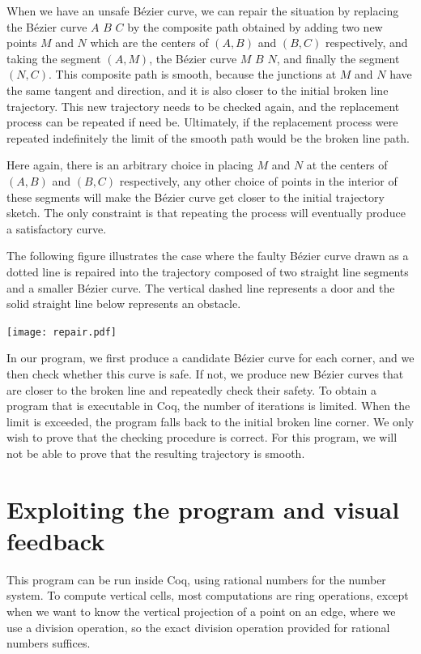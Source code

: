 \documentclass{llncs}
\begin{document}
When we have an unsafe Bézier curve, we can repair the situation by
replacing the Bézier curve \(A\) \(B\) \(C\) by the composite path
obtained by adding two new points \(M\) and \(N\) which are the
centers of \((A,B)\) and \((B,C)\) respectively, and taking the
segment \((A,M)\), the Bézier curve \(M\) \(B\) \(N\), and finally the
segment \((N, C)\).  This composite path is smooth, because the
junctions at \(M\) and \(N\) have the same tangent and direction, and
it is also closer to the initial broken line trajectory.  
This new trajectory needs to be checked again,
and the replacement process can be repeated if need be.  Ultimately,
if the replacement process were repeated indefinitely the limit of the
smooth path would be the broken line path.

Here again, there is an arbitrary choice in placing \(M\) and \(N\) at
the centers of \((A,B)\) and \((B,C)\) respectively, any other choice
of points in the interior of these segments will make the Bézier curve
get closer to the initial trajectory sketch.  The only constraint is
that repeating the process will eventually produce a satisfactory curve.

The following figure illustrates the case where the faulty Bézier
curve drawn as a dotted line is repaired into the trajectory composed of two
straight line segments and a smaller Bézier curve.  The vertical
dashed line represents a door and the solid straight line below
represents an obstacle.

\begin{center}
\texttt{[image: repair.pdf]}
\end{center}

In our program, we first produce a candidate Bézier curve for each
corner, and we then check whether this curve is safe.  If not, we
produce new Bézier curves that are closer to the broken line and
repeatedly check their safety.  To obtain a program that is executable
in Coq, the number of iterations is limited.  When the limit is exceeded,
the program falls back to the initial broken line corner.
We only wish to prove that the checking procedure is correct.  For
this program, we will not be able to prove that the resulting trajectory
is smooth.

\section{Exploiting the program and visual feedback}
This program can be run inside Coq, using rational numbers for the
number system.  To compute vertical cells, most computations are ring
operations, except when we want to know the vertical projection of a
point on an edge, where we use a division operation, so the exact
division operation provided for rational numbers suffices.
\end{document}
